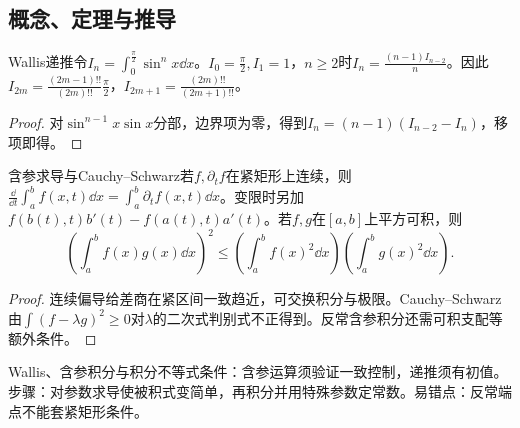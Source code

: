 \subsection{概念、定理与推导}

\begin{theorem}{Wallis递推}令$I_n=\int_0^{\frac{\pi}{2}}\sin^n x\dd x$。$I_0=\frac{\pi}{2},I_1=1$，$n\ge2$时$I_n=\frac{(n-1)I_{n-2}}{n}$。因此$I_{2m}=\frac{(2m-1)!!}{(2m)!!}\frac\pi2$，$I_{2m+1}=\frac{(2m)!!}{(2m+1)!!}$。\end{theorem}
\begin{proof}对$\sin^{n-1}x\sin x$分部，边界项为零，得到$I_n=(n-1)(I_{n-2}-I_n)$，移项即得。\end{proof}
\begin{theorem}{含参求导与Cauchy--Schwarz}若$f,\partial_tf$在紧矩形上连续，则$\frac{\dd}{\dd t}\int_a^bf(x,t)\dd x=\int_a^b\partial_tf(x,t)\dd x$。变限时另加$f(b(t),t)b\prime(t)-f(a(t),t)a\prime(t)$。若$f,g$在$[a,b]$上平方可积，则\[\left(\int_a^b f(x)g(x)\dd x\right)^2\le\left(\int_a^b f(x)^2\dd x\right)\left(\int_a^b g(x)^2\dd x\right).\]\end{theorem}
\begin{proof}连续偏导给差商在紧区间一致趋近，可交换积分与极限。Cauchy--Schwarz由$\int(f-\lambda g)^2\ge0$对$\lambda$的二次式判别式不正得到。反常含参积分还需可积支配等额外条件。\end{proof}

\begin{method}{Wallis、含参积分与积分不等式}条件：含参运算须验证一致控制，递推须有初值。步骤：对参数求导使被积式变简单，再积分并用特殊参数定常数。易错点：反常端点不能套紧矩形条件。\end{method}
